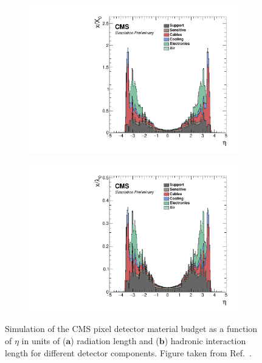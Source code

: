\begin{figure}[!htbp]
    \centering
    \begin{subfigure}[b]{0.49\textwidth}
        \centering
        \includegraphics[width=\textwidth]{Figures/Chapter3/Material_Budget1.pdf}
        \caption{}
    \end{subfigure}
    \begin{subfigure}[b]{0.49\textwidth}
        \centering
        \includegraphics[width=\textwidth]{Figures/Chapter3/Material_Budget2.pdf}
        \caption{}
    \end{subfigure}
\caption[Simulation of the CMS pixel detector material budget]{Simulation of the \ac{CMS} pixel detector material budget as a function of $\eta$ in units of ($\textbf{a}$) radiation length and ($\textbf{b}$) hadronic interaction length for different detector components. Figure taken from Ref.~\cite{TrackerMaterialBudget_Pixel}.}
\label{Figure:Chapter3_Tracker_MaterialBudget}
\end{figure}

